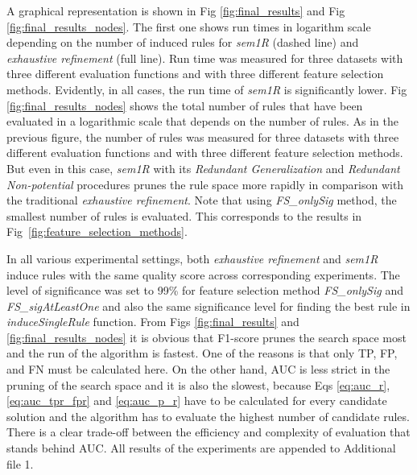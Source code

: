 \documentclass{bmcart}
\begin{document}



A graphical representation is shown in Fig \ref{fig:final_results} and Fig \ref{fig:final_results_nodes}. The first one shows run times in logarithm scale depending on the number of induced rules for \emph{sem1R} (dashed line) and \emph{exhaustive refinement} (full line). Run time was measured for three datasets with three different evaluation functions and with three different feature selection methods. Evidently, in all cases, the run time of \emph{sem1R} is significantly lower. Fig \ref{fig:final_results_nodes} shows the total number of rules that have been evaluated in a logarithmic scale that depends on the number of rules. As in the previous figure, the number of rules was measured for three datasets with three different evaluation functions and with three different feature selection methods. But even in this case, \emph{sem1R} with its \emph{Redundant Generalization} and \emph{Redundant Non-potential} procedures prunes the rule space more rapidly in comparison with the traditional \emph{exhaustive refinement}. Note that using \emph{FS\_onlySig} method, the smallest number of rules is evaluated. This corresponds to the results in Fig~\ref{fig:feature_selection_methods}.





In all various experimental settings, both \emph{exhaustive refinement} and \emph{sem1R} induce rules with the same quality score across corresponding experiments. The level of significance was set to 99\% for feature selection method \emph{FS\_onlySig} and \emph{FS\_sigAtLeastOne} and also the same significance level for finding the best rule in \emph{induceSingleRule} function. From Figs \ref{fig:final_results} and \ref{fig:final_results_nodes} it is obvious that  F1-score prunes the search space most and the run of the algorithm is fastest. One of the reasons is that only TP, FP, and FN must be calculated here. On the other hand, AUC is less strict in the pruning of the search space and it is also the slowest, because Eqs \ref{eq:auc_r}, \ref{eq:auc_tpr_fpr} and \ref{eq:auc_p_r} have to be calculated for every candidate solution and the algorithm has to evaluate the highest number of candidate rules. There is a clear trade-off between the efficiency and complexity of evaluation that stands behind AUC. All results of the experiments are appended to Additional file 1.
\end{document}
